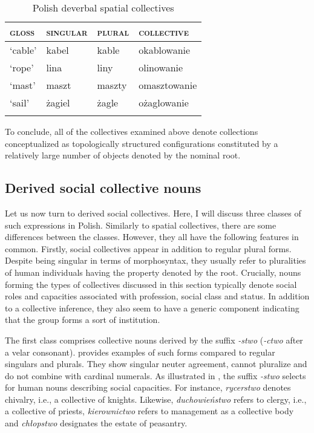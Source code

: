 \documentclass[output=paper]{langscibook}
\begin{document}
\begin{table}[h!]
\caption{Polish deverbal spatial collectives} 
\label{wan:tab:okablowanie}
 \begin{tabular}{llll} 
  \lsptoprule
           \textsc{gloss} & \textsc{singular} & \textsc{plural} & \textsc{collective} \\ 
  \midrule
  `cable'  &   kabel &    kable  &    okablowanie \\
  `rope'  &   lina &   liny &    olinowanie \\
  `mast'  &   maszt &   maszty &    omasztowanie \\
  `sail'  &   żagiel &   żagle &    ożaglowanie \\
  \lspbottomrule
 \end{tabular}
\end{table}

To conclude, all of the collectives examined above denote collections conceptualized as topologically structured configurations constituted by a relatively large number of objects denoted by the nominal root.  

\subsection{Derived social collective nouns}\label{wan:sec:derived-social-collective-nouns}\largerpage

Let us now turn to derived social collectives. Here, I will discuss three classes of such expressions in Polish. Similarly to spatial collectives, there are some differences between the classes. However, they all have the following features in common. Firstly, social collectives appear in addition to regular plural forms. Despite being singular in terms of morphosyntax, they usually refer to pluralities of human individuals having the property denoted by the root. Crucially, nouns forming the types of collectives discussed in this section typically denote social roles and capacities associated with profession, social class and status. In addition to a collective inference, they also seem to have a generic component indicating that the group forms a sort of institution.  

The first class comprises collective nouns derived by the suffix \textit{-stwo} (\textit{-ctwo} after a velar consonant).  provides examples of such forms compared to regular singulars and plurals. They show singular neuter agreement, cannot pluralize and do not combine with cardinal numerals. As illustrated in , the suffix \textit{-stwo} selects for human nouns describing social capacities. For instance, \textit{rycerstwo} denotes chivalry, i.e., a collective of knights. Likewise, \textit{duchowieństwo} refers to clergy, i.e., a collective of priests, \textit{kierownictwo} refers to management as a collective body and \textit{chłopstwo} designates the estate of peasantry.
\end{document}
